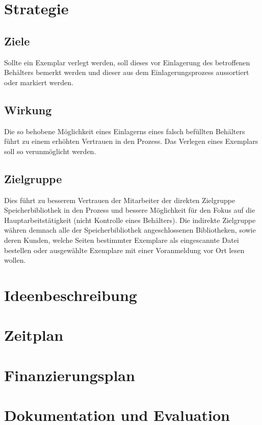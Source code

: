 \chapter{Strategie}

\section{Ziele}
Sollte ein Exemplar verlegt werden, soll dieses vor Einlagerung des betroffenen Behälters bemerkt werden und dieser aus dem Einlagerungsprozess aussortiert oder markiert werden.

\section{Wirkung}
Die so behobene Möglichkeit eines Einlagerns eines falsch befüllten Behälters führt zu einem erhöhten Vertrauen in den Prozess. Das Verlegen eines Exemplars soll so verunmöglicht werden.

\section{Zielgruppe}
Dies führt zu besserem Vertrauen der Mitarbeiter der direkten Zielgruppe Speicherbibliothek in den Prozess und bessere Möglichkeit für den Fokus auf die Hauptarbeitstätigkeit (nicht Kontrolle eines Behälters). Die indirekte Zielgruppe währen demnach alle der Speicherbibliothek angeschlossenen Bibliotheken, sowie deren Kunden, welche Seiten bestimmter Exemplare als eingescannte Datei bestellen oder ausgewählte Exemplare mit einer Voranmeldung vor Ort lesen wollen.

\chapter{Ideenbeschreibung}

\chapter{Zeitplan}

\chapter{Finanzierungsplan}

\chapter{Dokumentation und Evaluation}